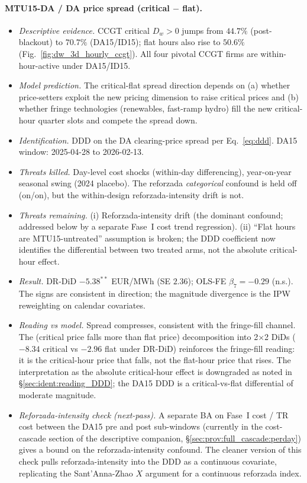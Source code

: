 \documentclass[11pt,a4paper]{article}
\begin{document}
\paragraph{MTU15-DA / DA price spread (critical $-$ flat).}
\begin{itemize}
\item \emph{Descriptive evidence.} CCGT critical $D_w > 0$ jumps from $44.7\%$ (post-blackout) to $70.7\%$ (DA15/ID15); flat hours also rise to $50.6\%$ (Fig.~\ref{fig:dw_3d_hourly_ccgt}). All four pivotal CCGT firms are within-hour-active under DA15/ID15.
\item \emph{Model prediction.} The critical-flat spread direction depends on (a) whether price-setters exploit the new pricing dimension to raise critical prices and (b) whether fringe technologies (renewables, fast-ramp hydro) fill the new critical-hour quarter slots and compete the spread down.
\item \emph{Identification.} DDD on the DA clearing-price spread per Eq.~\ref{eq:ddd}. DA15 window: 2025-04-28 to 2026-02-13.
\item \emph{Threats killed.} Day-level cost shocks (within-day differencing), year-on-year seasonal swing (2024 placebo). The reforzada \emph{categorical} confound is held off (on/on), but the within-design reforzada-intensity drift is not.
\item \emph{Threats remaining.} (i) Reforzada-intensity drift (the dominant confound; addressed below by a separate Fase~I cost trend regression). (ii) ``Flat hours are MTU15-untreated'' assumption is broken; the DDD coefficient now identifies the differential between two treated arms, not the absolute critical-hour effect.
\item \emph{Result.} DR-DiD $-5.38^{**}$ EUR/MWh (SE $2.36$); OLS-FE $\beta_7 = -0.29$ (n.s.). The signs are consistent in direction; the magnitude divergence is the IPW reweighting on calendar covariates.
\item \emph{Reading vs model.} Spread compresses, consistent with the fringe-fill channel. The (critical price falls more than flat price) decomposition into 2$\times$2 DiDs ($-8.34$ critical vs $-2.96$ flat under DR-DiD) reinforces the fringe-fill reading: it is the critical-hour price that falls, not the flat-hour price that rises. The interpretation as the absolute critical-hour effect is downgraded as noted in \S\ref{sec:ident:reading_DDD}; the DA15 DDD is a critical-vs-flat differential of moderate magnitude.
\item \emph{Reforzada-intensity check (next-pass).} A separate BA on Fase~I cost / TR cost between the DA15 pre and post sub-windows (currently in the cost-cascade section of the descriptive companion, \S\ref{sec:prov:full_cascade:perday}) gives a bound on the reforzada-intensity confound. The cleaner version of this check pulls reforzada-intensity into the DDD as a continuous covariate, replicating the Sant'Anna-Zhao $X$ argument for a continuous reforzada index.
\end{itemize}
\end{document}
